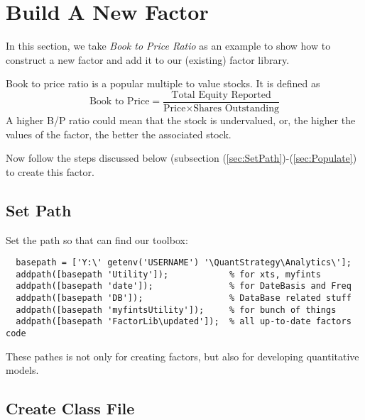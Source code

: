 \section{Build A New Factor\label{sec:steps}}

In this section, we take \emph{Book to Price Ratio} as an example to show how to construct a new factor
and add it to our (existing) factor library.

Book to price ratio is a popular multiple to value stocks.
It is defined as
\begin{equation}\label{eq:BKTOPRICE}
  \text{Book to Price} = \frac{\text{Total Equity Reported}}{\text{Price} \times\text{Shares Outstanding}}
\end{equation}
A higher B/P ratio could mean that the stock is undervalued,
or, the higher the values of the factor, the better the associated stock.

Now follow the steps discussed below (subsection (\ref{sec:SetPath})-(\ref{sec:Populate}) to create this factor.


\subsection{Set Path\label{sec:SetPath}}

 Set the path so that \matlab{} can find our toolbox:
\begin{lstlisting}
  basepath = ['Y:\' getenv('USERNAME') '\QuantStrategy\Analytics\'];
  addpath([basepath 'Utility']);            % for xts, myfints
  addpath([basepath 'date']);               % for DateBasis and Freq
  addpath([basepath 'DB']);                 % DataBase related stuff
  addpath([basepath 'myfintsUtility']);     % for bunch of things
  addpath([basepath 'FactorLib\updated']);  % all up-to-date factors code
\end{lstlisting}

These pathes is not only for creating factors, 
but also for developing quantitative models.

\subsection{Create Class File\label{sec:CreateClassFile}}

